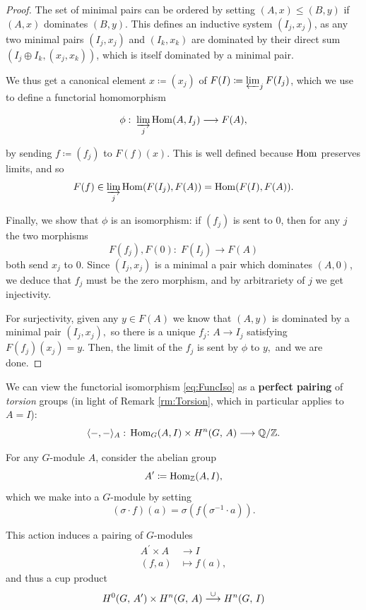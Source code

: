 \documentclass[a4paper, oneside]{memoir}
\begin{document}
\begin{proof}
    The set of minimal pairs can be ordered by setting \((A,x)\leq (B,y)\) if \((A,x)\) dominates \((B,y)\). This defines an inductive system \((I_j,x_j)\), as any two minimal pairs \((I_j,x_j)\) and \((I_k,x_k)\) are dominated by their direct sum \(\left(I_j\oplus I_k,(x_j,x_k)\right)\), which is itself dominated by a minimal pair.

    We thus get a canonical element \(x\coloneqq (x_j)\) of \(F(I)\coloneqq \varprojlim_j F(I_j)\), which we use to define a functorial homomorphism

    \[
        \phi: \; \varinjlim_j \operatorname{Hom}(A,I_j)\longrightarrow F(A),
    \]

    by sending \(f\coloneqq (f_j)\) to \(F(f)(x)\). This is well defined because \(\operatorname{Hom}\) preserves limits, and so
    \[
        F(f)\in\varinjlim_j{\operatorname{Hom}(F(I_j),F(A))}=\operatorname{Hom}(F(I),F(A)).
    \]

    Finally, we show that \(\phi\) is an isomorphism: if \((f_j)\) is sent to \(0\), then for any \(j\) the two morphisms
    \[
        F(f_j), F(0):\; F(I_j) \to F(A)
    \]
    both send \(x_j\) to \(0.\) Since \((I_j,x_j)\) is a minimal a pair which dominates \((A,0)\), we deduce that \(f_j\) must be the zero morphism, and by arbitrariety of \(j\) we get injectivity.

    For surjectivity, given any \(y\in F(A)\) we know that \((A,y)\) is dominated by a minimal pair \((I_j,x_j),\) so there is a unique \(f_j:\, A\to I_j\) satisfying \(F(f_j)(x_j)=y.\) Then, the limit of the \(f_j\) is sent by \(\phi\) to \(y,\) and we are done.
\end{proof}


\begin{remark}
    We can view the functorial isomorphism \eqref{eq:FuncIso} as a \textbf{perfect pairing} of \textit{torsion} groups (in light of Remark \ref{rm:Torsion}, which in particular applies to $A=I$):
    \[
        \langle-,-\rangle_A:\,\operatorname{Hom}_G(A,I)\times H^{n}( G, \, A )\longrightarrow\mathbb{Q} /\mathbb{Z}.
    \]
\end{remark}

For any \(G\)-module \(A\), consider the abelian group
\[
    A^{\prime}\coloneqq \operatorname{Hom}_{\mathbb{Z}}(A,I),
\]
which we make into a \(G\)-module by setting
\begin{equation}\label{eq:TateTwist}
    (\sigma\cdot f)(a)=\sigma(f(\sigma^{-1}\cdot a)).
\end{equation}

This action induces a pairing of \(G\)-modules
\begin{align*}
    A^\prime\times A & \to I         \\
    (f,a)            & \mapsto f(a),
\end{align*}
and thus a cup product
\[
    H^{0}( G, \, A^\prime )\times H^{n}( G, \, A )\overset{\cup}{\longrightarrow}H^{n}( G, \, I )
\]
\end{document}
